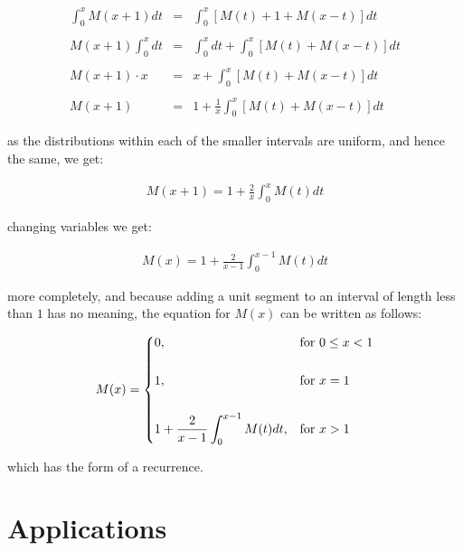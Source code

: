 \begin{eqnarray*}
	\int_{0}^{x} M(x + 1) dt & = & \int_{0}^{x} [M(t) + 1 + M(x - t)] dt \\\\
	M(x + 1) \int_{0}^{x} dt & = & \int_{0}^{x} dt + \int_{0}^{x} [M(t) + M(x - t)] dt \\\\
			M(x + 1) \cdot x & = & x + \int_{0}^{x} [M(t) + M(x - t)] dt \\\\
					M(x + 1) & = & 1 + \frac{1}{x} \int_{0}^{x} [M(t) + M(x - t)] dt 
\end{eqnarray*}\medskip

as the distributions within each of the smaller intervals are uniform, and hence 
the same, we get: \bigskip

\begin{eqnarray} \label{eq:1}
	M(x + 1) = 1 + \frac{2}{x} \int_{0}^{x} M(t) dt
\end{eqnarray}\medskip

changing variables we get: \bigskip

\begin{eqnarray} \label{eq:2}
	M(x) = 1 + \frac{2}{x - 1} \int_{0}^{x - 1} M(t) dt
\end{eqnarray}\medskip

more completely, and because adding a unit segment to an interval of length less 
than $1$ has no meaning, the equation for $M(x)$ can be written as follows: \bigskip

\begin{eqnarray} \label{eq:3}
	M(x) = 
	\begin{dcases}
		0,                                            & \text{for } 0 \leq x < 1 \\\\
		1,                                            & \text{for } x = 1 \\\\
		1 + \frac{2}{x - 1} \int_{0}^{x - 1} M(t) dt, & \text{for } x > 1
	\end{dcases}
\end{eqnarray}\medskip

which has the form of a recurrence. 






\section{Applications}

